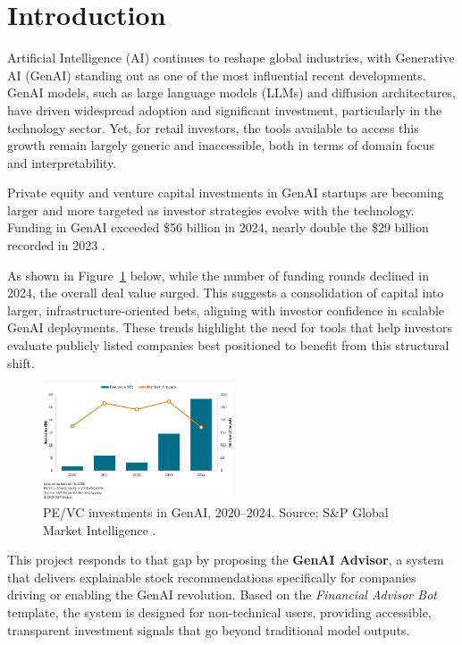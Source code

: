 \section{Introduction}

Artificial Intelligence (AI) continues to reshape global industries, with Generative AI (GenAI) standing out as one of the most influential recent developments. GenAI models, such as large language models (LLMs) and diffusion architectures, have driven widespread adoption and significant investment, particularly in the technology sector. Yet, for retail investors, the tools available to access this growth remain largely generic and inaccessible, both in terms of domain focus and interpretability.

Private equity and venture capital investments in GenAI startups are becoming larger and more targeted as investor strategies evolve with the technology. Funding in GenAI exceeded \$56 billion in 2024, nearly double the \$29 billion recorded in 2023 \citep{spglobal2025}.

As shown in Figure~\ref{fig:genai-investment} below, while the number of funding rounds declined in 2024, the overall deal value surged. This suggests a consolidation of capital into larger, infrastructure-oriented bets, aligning with investor confidence in scalable GenAI deployments. These trends highlight the need for tools that help investors evaluate publicly listed companies best positioned to benefit from this structural shift.

\begin{figure}[h]
    \centering
    \includegraphics[width=0.5\textwidth]{assets/investGenAI.png}
    \caption{\small PE/VC investments in GenAI, 2020–2024. Source: S\&P Global Market Intelligence \citep{spglobal2025}.}
    \label{fig:genai-investment}
\end{figure}

This project responds to that gap by proposing the \textbf{GenAI Advisor}, a system that delivers explainable stock recommendations specifically for companies driving or enabling the GenAI revolution. Based on the \textit{Financial Advisor Bot} template, the system is designed for non-technical users, providing accessible, transparent investment signals that go beyond traditional model outputs.

